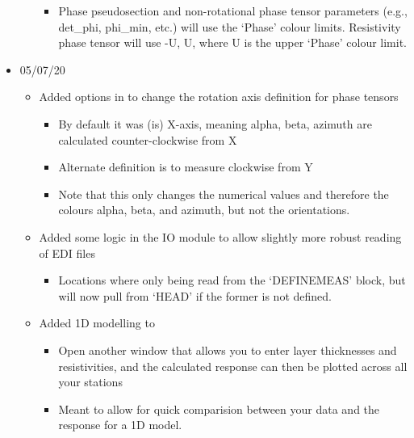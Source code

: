 \documentclass[letterpaper,10pt,english]{sphinxmanual}
\begin{document}
\begin{itemize}
\begin{itemize}
\begin{itemize}
\item {} 
Phase pseudosection and non-rotational phase tensor parameters (e.g., det\_phi, phi\_min, etc.) will use the ‘Phase’ colour limits. Resistivity phase tensor will use -U, U, where U is the upper ‘Phase’ colour limit.

\end{itemize}

\end{itemize}

\item {} 
05/07/20
\begin{itemize}
\item {} 
Added options in {\hyperref[\detokenize{content/data_plot/map_viewer:map-viewer}]{}} to change the rotation axis definition for phase tensors
\begin{itemize}
\item {} 
By default it was (is) X-axis, meaning alpha, beta, azimuth are calculated counter-clockwise from X

\item {} 
Alternate definition is to measure clockwise from Y

\item {} 
Note that this only changes the numerical values and therefore the colours alpha, beta, and azimuth, but not the orientations.

\end{itemize}

\item {} 
Added some logic in the IO module to allow slightly more robust reading of EDI files
\begin{itemize}
\item {} 
Locations where only being read from the ‘DEFINEMEAS’ block, but will now pull from ‘HEAD’ if the former is not defined.

\end{itemize}

\item {} 
Added 1D modelling to {\hyperref[\detokenize{content/data_plot/main_window:data-plot}]{}}
\begin{itemize}
\item {} 
Open another window that allows you to enter layer thicknesses and resistivities, and the calculated response can then be plotted across all your stations

\item {} 
Meant to allow for quick comparision between your data and the response for a 1D model.


\end{itemize}
\end{itemize}
\end{itemize}
\end{document}
